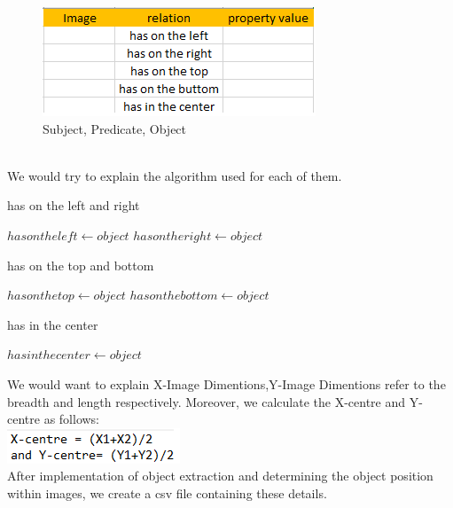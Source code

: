 \documentclass[12pt]{article}
\begin{document}
\begin{figure}[!h]
\center
\includegraphics{images/tblrc.png}
\caption{Subject, Predicate, Object}
\end{figure}
\\ We would try to explain the algorithm used for each of them.
\begin{algorithm}
  \caption{has on the left and right}\label{algo:algo}
  \begin{algorithmic}[1]
        \STATE $has on the left
\gets object$
\ELSE
                \STATE $has on the right\gets object$
        \ENDIF
\ENDIF   
  \end{algorithmic}
\end{algorithm}
\begin{algorithm}
  \caption{has on the top and bottom}\label{algo:algo}
  \begin{algorithmic}[1]
        \STATE $has on the top
\gets object$
\ELSE
                \STATE $has on the bottom\gets object$
        \ENDIF
\ENDIF   
  \end{algorithmic}
\end{algorithm}

\newpage
\begin{algorithm}
  \caption{has in the center}\label{algo:algo}
  \begin{algorithmic}[1]
    \STATE $has in the center \gets object$

  \end{algorithmic}
\end{algorithm}
We would want to explain X-Image Dimentions,Y-Image Dimentions refer to the breadth and length respectively. Moreover, we calculate the X-centre and Y-centre as follows:\\ \includegraphics{images/addition.png} \\
After implementation of object extraction and determining the object position within images, we create a csv file containing these details. 
\end{document}
